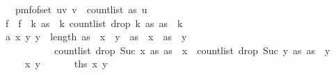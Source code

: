 \begin{isabellebody}
\ \ {\isacharequal}{\kern0pt}\ pmf{\isacharunderscore}{\kern0pt}of{\isacharunderscore}{\kern0pt}set\ {\isacharbraceleft}{\kern0pt}{\isacharparenleft}{\kern0pt}u{\isacharcomma}{\kern0pt}v{\isacharparenright}{\kern0pt}{\isachardot}{\kern0pt}\ v\ {\isacharless}{\kern0pt}\ count{\isacharunderscore}{\kern0pt}list\ as\ u{\isacharbraceright}{\kern0pt}{\isachardoublequoteclose}\isanewline
%
\isadelimproof
%
\endisadelimproof
%
\isatagproof
{}\isamarkupfalse%
\ {\isacharminus}{\kern0pt}\isanewline
\ \ \isamarkupfalse%
\ f\ \ {\isachardoublequoteopen}f\ {\isacharequal}{\kern0pt}\ {\isacharparenleft}{\kern0pt}{\isasymlambda}k{\isachardot}{\kern0pt}\ {\isacharparenleft}{\kern0pt}as\ {\isacharbang}{\kern0pt}\ k{\isacharcomma}{\kern0pt}\ count{\isacharunderscore}{\kern0pt}list\ {\isacharparenleft}{\kern0pt}drop\ {\isacharparenleft}{\kern0pt}k{\isacharplus}{\kern0pt}{}{\isacharparenright}{\kern0pt}\ as{\isacharparenright}{\kern0pt}\ {\isacharparenleft}{\kern0pt}as\ {\isacharbang}{\kern0pt}\ k{\isacharparenright}{\kern0pt}{\isacharparenright}{\kern0pt}{\isacharparenright}{\kern0pt}{\isachardoublequoteclose}\isanewline
\isanewline
\ \ \isamarkupfalse%
\ a{}{\isacharcolon}{\kern0pt}\ {\isachardoublequoteopen}{\isasymAnd}x\ y{\isachardot}{\kern0pt}\ y\ {\isacharless}{\kern0pt}\ length\ as\ {\isasymLongrightarrow}\ x\ {\isacharless}{\kern0pt}\ y\ {\isasymLongrightarrow}\ as\ {\isacharbang}{\kern0pt}\ x\ {\isacharequal}{\kern0pt}\ as\ {\isacharbang}{\kern0pt}\ y\ {\isasymLongrightarrow}\isanewline
\ \ \ \ \ \ \ \ \ \ \ count{\isacharunderscore}{\kern0pt}list\ {\isacharparenleft}{\kern0pt}drop\ {\isacharparenleft}{\kern0pt}Suc\ x{\isacharparenright}{\kern0pt}\ as{\isacharparenright}{\kern0pt}\ {\isacharparenleft}{\kern0pt}as\ {\isacharbang}{\kern0pt}\ x{\isacharparenright}{\kern0pt}\ {\isasymnoteq}\ count{\isacharunderscore}{\kern0pt}list\ {\isacharparenleft}{\kern0pt}drop\ {\isacharparenleft}{\kern0pt}Suc\ y{\isacharparenright}{\kern0pt}\ as{\isacharparenright}{\kern0pt}\ {\isacharparenleft}{\kern0pt}as\ {\isacharbang}{\kern0pt}\ y{\isacharparenright}{\kern0pt}{\isachardoublequoteclose}\ \isanewline
\ \ \ \ {\isacharparenleft}{\kern0pt}\ {\isachardoublequoteopen}{\isasymAnd}x\ y{\isachardot}{\kern0pt}\ {\isacharunderscore}{\kern0pt}\ {\isasymLongrightarrow}\ {\isacharunderscore}{\kern0pt}\ {\isasymLongrightarrow}\ {\isacharunderscore}{\kern0pt}\ {\isasymLongrightarrow}\ {\isacharquery}{\kern0pt}ths\ x\ y{\isachardoublequoteclose}{\isacharparenright}{\kern0pt}\isanewline

\end{isabellebody}
